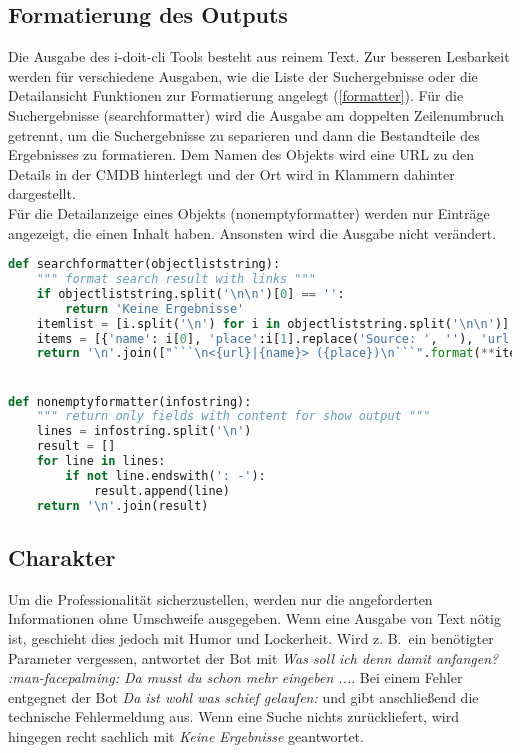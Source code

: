\subsection{Formatierung des Outputs}
Die Ausgabe des i-doit-cli Tools besteht aus reinem Text. Zur besseren Lesbarkeit werden für verschiedene Ausgaben, wie die Liste der Suchergebnisse oder die Detailansicht Funktionen zur Formatierung angelegt (\autoref{formatter}).
Für die Suchergebnisse (searchformatter) wird die Ausgabe am doppelten Zeilenumbruch getrennt, um die Suchergebnisse zu separieren und dann die Bestandteile des Ergebnisses zu formatieren. Dem Namen des Objekts wird eine URL zu den Details in der \acs{CMDB} hinterlegt und der Ort wird in Klammern dahinter dargestellt.\\
Für die Detailanzeige eines Objekts (nonemptyformatter) werden nur Einträge angezeigt, die einen Inhalt haben. Ansonsten wird die Ausgabe nicht verändert.

\begin{lstlisting}[language=python, label=formatter, caption=Funktionen zur Formatierung]
def searchformatter(objectliststring):
    """ format search result with links """
    if objectliststring.split('\n\n')[0] == '':
        return 'Keine Ergebnisse'
    itemlist = [i.split('\n') for i in objectliststring.split('\n\n')]  # get single lines for every search result item
    items = [{'name': i[0], 'place':i[1].replace('Source: ', ''), 'url': i[2].replace('Link: ', '')} for i in itemlist]  # save information to dict and remove description in text
    return '\n'.join(["```\n<{url}|{name}> ({place})\n```".format(**item) for item in items])


def nonemptyformatter(infostring):
    """ return only fields with content for show output """
    lines = infostring.split('\n')
    result = []
    for line in lines:
        if not line.endswith(': -'):
            result.append(line)
    return '\n'.join(result)
\end{lstlisting}


\subsection{Charakter}
Um die Professionalität sicherzustellen, werden nur die angeforderten Informationen ohne Umschweife ausgegeben. Wenn eine Ausgabe von Text nötig ist, geschieht dies jedoch mit Humor und Lockerheit. Wird z. B.~ein benötigter Parameter vergessen, antwortet der Bot mit \textit{Was soll ich denn damit anfangen? :man-facepalming: Da musst du schon mehr eingeben ...}. Bei einem Fehler entgegnet der Bot \textit{Da ist wohl was schief gelaufen:} und gibt anschließend die technische Fehlermeldung aus. Wenn eine Suche nichts zurückliefert, wird hingegen recht sachlich mit \textit{Keine Ergebnisse} geantwortet. 

